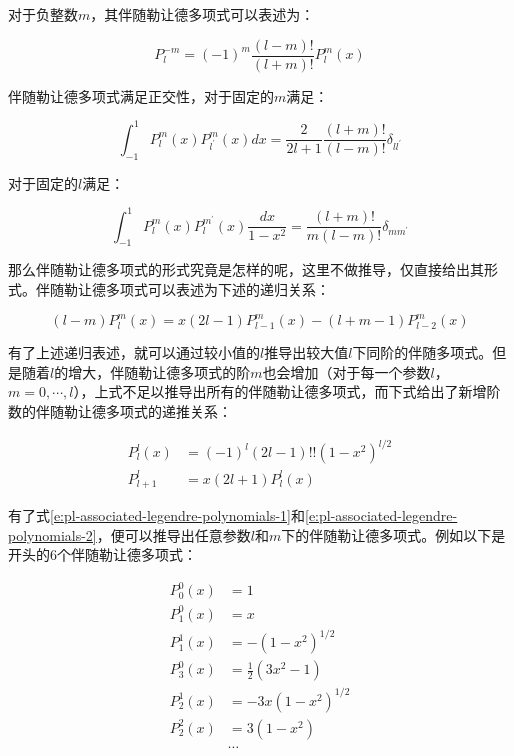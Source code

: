 对于负整数$m$，其伴随勒让德多项式可以表述为：

\begin{equation}
	P_{l}^{-m}=(-1)^{m}\frac{(l-m)!}{(l+m)!}P^{m}_{l}(x)
\end{equation}

伴随勒让德多项式满足正交性，对于固定的$m$满足：

\begin{equation}
	\int^{1}_{-1}P^{m}_l(x) P^{m}_{l^{'}}(x)dx=\frac{2}{2l+1}\frac{(l+m)!}{(l-m)!}\delta_{ll^{'}}
\end{equation}

对于固定的$l$满足：

\begin{equation}
	\int^{1}_{-1}P^{m}_l(x)P^{m^{'}}_l(x)\frac{dx}{1-x^{2}}=\frac{(l+m)!}{m(l-m)!}\delta_{mm^{'}}
\end{equation}

那么伴随勒让德多项式的形式究竟是怎样的呢，这里不做推导，仅直接给出其形式。伴随勒让德多项式可以表述为下述的递归关系：

\begin{equation}\label{e:pl-associated-legendre-polynomials-1}
	(l-m)P^{m}_{l}(x)=x(2l-1)P^{m}_{l-1}(x)-(l+m-1)P^{m}_{l-2}(x)
\end{equation}

有了上述递归表述，就可以通过较小值的$l$推导出较大值$l$下同阶的伴随多项式。但是随着$l$的增大，伴随勒让德多项式的阶$m$也会增加（对于每一个参数$l$，$m=0,\cdots,l$），上式不足以推导出所有的伴随勒让德多项式，而下式给出了新增阶数的伴随勒让德多项式的递推关系：

\begin{equation}\label{e:pl-associated-legendre-polynomials-2}
\begin{aligned}
	P^{l}_l(x)&=(-1)^{l}(2l-1)!!(1-x^{2})^{l/2}\\
	P^{l}_{l+1}&=x(2l+1)P^{l}_l(x)
\end{aligned}
\end{equation}

有了式\ref{e:pl-associated-legendre-polynomials-1}和\ref{e:pl-associated-legendre-polynomials-2}，便可以推导出任意参数$l$和$m$下的伴随勒让德多项式。例如以下是开头的6个伴随勒让德多项式：

\begin{equation}
\begin{aligned}
	P^{0}_0(x)&=1\\
	P^{0}_1(x)&=x\\
	P^{1}_1(x)&=-(1-x^{2})^{1/2}\\
	P^{0}_3(x)&=\frac{1}{2}(3x^{2}-1)\\
	P^{1}_2(x)&=-3x(1-x^{2})^{1/2}\\
	P^{2}_2(x)&=3(1-x^{2})\\
	&\cdots
\end{aligned}
\end{equation}

